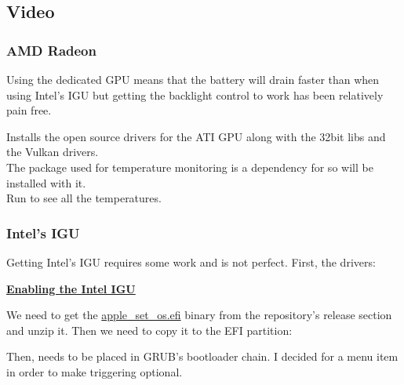\subsection{Video}

\subsubsection{AMD Radeon}

Using the dedicated GPU means that the battery will drain faster than when using Intel's IGU but getting the backlight control to work has been relatively pain free.

\begin{blocksection}
	Installs the open source drivers for the ATI GPU along with the 32bit libs and the Vulkan drivers.\\
	The \href{https://wiki.archlinux.org/index.php/Lm_sensors}{} package used for temperature monitoring is a dependency for  so will be installed with it.\\
	Run  to see all the temperatures.
\end{blocksection}

\subsubsection{Intel's IGU}

Getting Intel's IGU requires some work and is not perfect. First, the drivers:


\vspace*{1em}
\textbf{\textcolor{textgrey}{\uline{Enabling the Intel IGU}}}

We need to get the  \href{https://github.com/0xbb/apple\_set_os.efi}{apple\_set\_os.efi} binary from the repository's release section and unzip it. Then we need to copy it to the EFI partition:


Then,  needs to be placed in GRUB's bootloader chain. I decided for a menu item in order to make triggering  optional.


